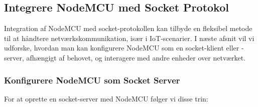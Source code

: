 \subsection*{Integrere NodeMCU med Socket Protokol}
Integration af NodeMCU med socket-protokollen kan tilbyde en fleksibel metode til at håndtere netværkskommunikation, især i IoT-scenarier. I næste afsnit vil vi udforske, hvordan man kan konfigurere NodeMCU som en socket-klient eller -server, afhængigt af behovet, og interagere med andre enheder over netværket.

\subsubsection*{Konfigurere NodeMCU som Socket Server}
For at oprette en socket-server med NodeMCU følger vi disse trin:


